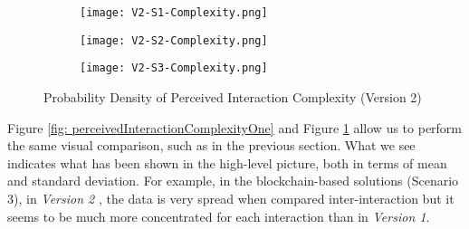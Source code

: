\begin{figure}[htb]
	\centering
	\begin{subfigure}[b]{0.49\textwidth}
		\centering
		\texttt{[image: V2-S1-Complexity.png]}
	\end{subfigure}
	\begin{subfigure}[b]{0.49\textwidth}
		\centering
		\texttt{[image: V2-S2-Complexity.png]}
	\end{subfigure}
	\hfill
	\begin{subfigure}[b]{0.49\textwidth}
		\centering
		\texttt{[image: V2-S3-Complexity.png]}
	\end{subfigure}

	\caption{Probability Density of Perceived Interaction Complexity (Version 2)}
	\label{fig: perceivedInteractionComplexityTwo}
\end{figure}

Figure \ref{fig: perceivedInteractionComplexityOne} and Figure \ref{fig: perceivedInteractionComplexityTwo} allow us to perform the same visual comparison, such as in the previous section. What we see indicates what has been shown in the high-level picture, both in terms of mean and standard deviation. For example, in the blockchain-based solutions (Scenario 3), in \textit{Version 2} , the data is very spread when compared inter-interaction but it seems to be much more concentrated for each interaction than in \textit{Version 1}.